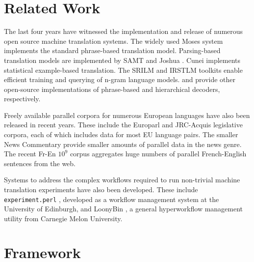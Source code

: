 \documentclass[11pt]{article}
\begin{document}
\section{Related Work}
\label{Related Work}

The last four years have witnessed the implementation and release of numerous open source machine translation systems. The widely used Moses system implements the standard phrase-based translation model. Parsing-based translation models are implemented by SAMT \cite{samt2006} and Joshua \cite{Joshua-WMT}. Cunei \cite{Phillips2009} implements statistical example-based translation. The SRILM \cite{Stolcke2002} and IRSTLM \cite{IRSTLM} toolkits enable efficient training and querying of n-gram language models.  and  provide other open-source implementations of phrase-based and hierarchical decoders, respectively.

Freely available parallel corpora for numerous European languages have also been released in recent years. These include the Europarl \cite{Koehn-europarl} and JRC-Acquis \cite{Steinberger-2006} legislative corpora, each of which includes data for most EU language pairs. The smaller News Commentary \cite{Callison-Burch2007a,Callison-Burch2008a} provide smaller amounts of parallel data in the news genre. The recent Fr-En $10^9$ \cite{WMT09-Findings} corpus aggregates huge numbers of parallel French-English sentences from the web.

Systems to address the complex workflows required to run non-trivial machine translation experiments have also been developed. These include {\tt experiment.perl} \cite{experiment.perl}, developed as a workflow management system at the University of Edinburgh, and LoonyBin \cite{LoonyBin}, a general hyperworkflow management utility from Carnegie Melon University.


\section{Framework}
\label{Framework}
\end{document}
